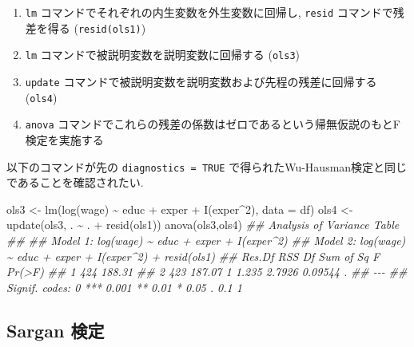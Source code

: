 \documentclass[
  letterpaper,
  xelatex,
  ja=standard, xelatex]{bxjsbook}
\newenvironment{Shaded}{\begin{snugshade}}{\end{snugshade}}
\newcommand{\AttributeTok}[1]{\textcolor[rgb]{0.40,0.45,0.13}{#1}}
\newcommand{\DecValTok}[1]{\textcolor[rgb]{0.68,0.00,0.00}{#1}}
\newcommand{\DocumentationTok}[1]{\textcolor[rgb]{0.37,0.37,0.37}{\textit{#1}}}
\newcommand{\FunctionTok}[1]{\textcolor[rgb]{0.28,0.35,0.67}{#1}}
\newcommand{\NormalTok}[1]{\textcolor[rgb]{0.00,0.23,0.31}{#1}}
\newcommand{\OtherTok}[1]{\textcolor[rgb]{0.00,0.23,0.31}{#1}}
\newcommand{\SpecialCharTok}[1]{\textcolor[rgb]{0.37,0.37,0.37}{#1}}
\providecommand{\tightlist}{%
  \setlength{\itemsep}{0pt}\setlength{\parskip}{0pt}}\usepackage{longtable,booktabs,array}
\begin{document}
\begin{enumerate}
\def\labelenumi{\arabic{enumi}.}
\tightlist
\item
  \texttt{lm} コマンドでそれぞれの内生変数を外生変数に回帰し,
  \texttt{resid} コマンドで残差を得る (\texttt{resid(ols1)})
\item
  \texttt{lm} コマンドで被説明変数を説明変数に回帰する (\texttt{ols3})
\item
  \texttt{update}
  コマンドで被説明変数を説明変数および先程の残差に回帰する
  (\texttt{ols4})
\item
  \texttt{anova}
  コマンドでこれらの残差の係数はゼロであるという帰無仮説のもとF検定を実施する
\end{enumerate}

以下のコマンドが先の \texttt{diagnostics\ =\ TRUE}
で得られたWu-Hausman検定と同じであることを確認されたい.

\begin{Shaded}
\begin{Highlighting}[]
\NormalTok{ols3 }\OtherTok{\textless{}{-}} \FunctionTok{lm}\NormalTok{(}\FunctionTok{log}\NormalTok{(wage) }\SpecialCharTok{\textasciitilde{}}\NormalTok{ educ  }\SpecialCharTok{+}\NormalTok{ exper }\SpecialCharTok{+} \FunctionTok{I}\NormalTok{(exper}\SpecialCharTok{\^{}}\DecValTok{2}\NormalTok{), }\AttributeTok{data =}\NormalTok{ df)}
\NormalTok{ols4 }\OtherTok{\textless{}{-}} \FunctionTok{update}\NormalTok{(ols3, . }\SpecialCharTok{\textasciitilde{}}\NormalTok{ . }\SpecialCharTok{+} \FunctionTok{resid}\NormalTok{(ols1))}
\FunctionTok{anova}\NormalTok{(ols3,ols4)}
\DocumentationTok{\#\# Analysis of Variance Table}
\DocumentationTok{\#\# }
\DocumentationTok{\#\# Model 1: log(wage) \textasciitilde{} educ + exper + I(exper\^{}2)}
\DocumentationTok{\#\# Model 2: log(wage) \textasciitilde{} educ + exper + I(exper\^{}2) + resid(ols1)}
\DocumentationTok{\#\#   Res.Df    RSS Df Sum of Sq      F  Pr(\textgreater{}F)  }
\DocumentationTok{\#\# 1    424 188.31                              }
\DocumentationTok{\#\# 2    423 187.07  1     1.235 2.7926 0.09544 .}
\DocumentationTok{\#\# {-}{-}{-}}
\DocumentationTok{\#\# Signif. codes:  0 \textquotesingle{}***\textquotesingle{} 0.001 \textquotesingle{}**\textquotesingle{} 0.01 \textquotesingle{}*\textquotesingle{} 0.05 \textquotesingle{}.\textquotesingle{} 0.1 \textquotesingle{} \textquotesingle{} 1}
\end{Highlighting}
\end{Shaded}

\subsection{Sargan 検定}\label{sargan-ux691cux5b9a}
\end{document}
